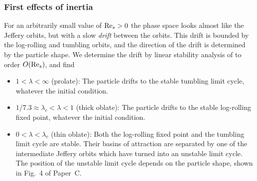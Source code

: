 \documentclass[thesis.tex]{subfiles}
\begin{document}
\subsubsection*{First effects of inertia}
For an arbitrarily small value of $\textrm{Re}_s>0$ the phase space looks almost like the Jeffery orbits, but with a slow \emph{drift} between the orbits. This drift is bounded by the log-rolling and tumbling orbits, and the direction of the drift is determined by the particle shape. We determine the drift by linear stability analysis of  to order $O(\textrm{Re}_s)$, and find 
\begin{itemize}
    \item $1 < \lambda < \infty$ (prolate): The particle drifts to the stable tumbling limit cycle, whatever the initial condition.
    \item $1/7.3\approx\lambda_c < \lambda < 1$ (thick oblate): The particle drifts to the stable log-rolling fixed point, whatever the initial condition.
    \item $0 < \lambda < \lambda_c$ (thin oblate): Both the log-rolling fixed point and the tumbling limit cycle are stable. Their basins of attraction are separated by one of the intermediate Jeffery orbits which have turned into an unstable limit cycle. The position of the unstable limit cycle depends on the particle shape, shown in Fig.~4 of Paper~C. 
\end{itemize}
\end{document}
